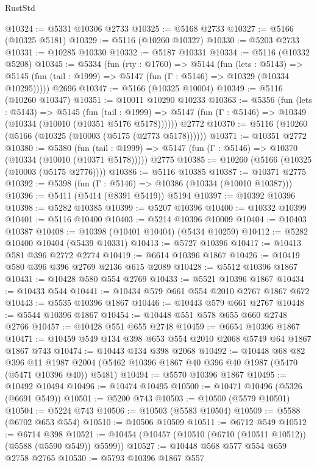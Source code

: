 \begin{lexlean}{RustStd}
\begin{coremodule}
@10324 := @5331 @10306 @2733
@10325 := @5168 @2733
@10327 := @5166 (@10325 @5181)
@10329 := @5116 (@10260 @10327)
@10330 := @5203 @2733
@10331 := @10285 @10330
@10332 := @5187 @10331
@10334 := @5116 (@10332 @5208)
@10345 := @5334
    (fun (rty : @1760) =>
    @5144
      (fun (lets : @5143) =>
      @5145 (fun (tail : @1999) => @5147 (fun (Γ : @5146) => @10329 (@10334 @10295)))))
    @2696
@10347 := @5166 (@10325 @10004)
@10349 := @5116 (@10260 @10347)
@10351 := @10011 @10290 @10233
@10363 := @5356
    (fun (lets : @5143) =>
    @5145
      (fun (tail : @1999) =>
      @5147 (fun (Γ : @5146) => @10349 (@10334 (@10010 (@10351 @5176 @5178))))))
    @2772
@10370 := @5116 (@10260 (@5166 (@10325 (@10003 (@5175 (@2773 @5178))))))
@10371 := @10351 @2772
@10380 := @5380
    (fun (tail : @1999) => @5147 (fun (Γ : @5146) => @10370 (@10334 (@10010 (@10371 @5178)))))
    @2775
@10385 := @10260 (@5166 (@10325 (@10003 (@5175 @2776))))
@10386 := @5116 @10385
@10387 := @10371 @2775
@10392 := @5398 (fun (Γ : @5146) => @10386 (@10334 (@10010 @10387)))
@10396 := @5411 (@5414 (@8391 @5419)) @5194
@10397 := @10392 @10396
@10398 := @5282 @10385
@10399 := @5207 @10396
@10400 := @10332 @10399
@10401 := @5116 @10400
@10403 := @5214 @10396 @10009
@10404 := @10403 @10387
@10408 := @10398 (@10401 @10404) (@5434 @10259)
@10412 := @5282 @10400 @10404 (@5439 @10331)
@10413 := @5727 @10396
@10417 := @10413 @581 @396 @2772 @2774
@10419 := @6614 @10396 @1867
@10426 := @10419 @580 @396 @396 @2769 @2136 @615 @2089
@10428 := @5512 @10396 @1867
@10431 := @10428 @580 @554 @2769
@10433 := @5521 @10396 @1867
@10434 := @10433 @544
@10441 := @10434 @579 @661 @554 @2010 @2767 @1867 @672
@10443 := @5535 @10396 @1867
@10446 := @10443 @579 @661 @2767
@10448 := @5544 @10396 @1867
@10454 := @10448 @551 @578 @655 @660 @2748 @2766
@10457 := @10428 @551 @655 @2748
@10459 := @6654 @10396 @1867
@10471 := @10459 @549 @134 @398 @653 @554 @2010 @2068 @5749 @64 @1867 @1867 @743
@10474 := @10443 @134 @398 @2068
@10492 := @10448
    @68
    @82
    @396
    @11
    @1987
    @2004
    (@5462 @10396 @1867 @40 @396 @40 @1987 (@5470 (@5471 @10396 @40)) @5481)
@10494 := @5570 @10396 @1867
@10495 := @10492 @10494
@10496 := @10474 @10495
@10500 := @10471 @10496 (@5326 (@6691 @549))
@10501 := @5200 @743
@10503 := @10500 (@5579 @10501)
@10504 := @5224 @743
@10506 := @10503 (@5583 @10504)
@10509 := @5588 (@6702 @653 @554)
@10510 := @10506 @10509
@10511 := @6712 @549
@10512 := @6714 @398
@10521 := @10454 (@10457 (@10510 (@6710 (@10511 @10512)) (@5588 (@5590 @549)) @5599))
@10527 := @10448 @568 @577 @554 @659 @2758 @2765
@10530 := @5793 @10396 @1867 @557

\end{coremodule}
\end{lexlean}

